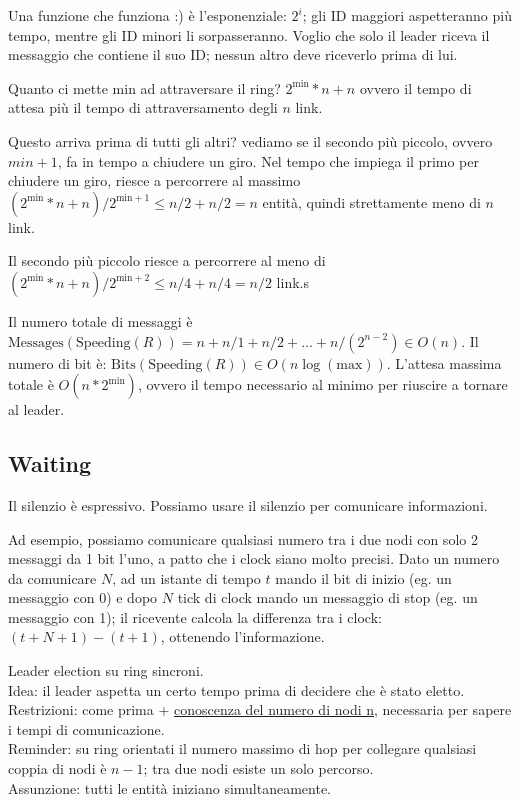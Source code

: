 Una funzione che funziona :) è l'esponenziale: $2^i$; gli ID maggiori aspetteranno più tempo, mentre gli ID minori li sorpasseranno.
Voglio che solo il leader riceva il messaggio che contiene il suo ID; nessun altro deve riceverlo prima di lui.

Quanto ci mette min ad attraversare il ring? $2^\text{min} * n + n$ ovvero il tempo di attesa più il tempo di attraversamento degli $n$ link.

Questo arriva prima di tutti gli altri? vediamo se il secondo più piccolo, ovvero $min+1$, fa in tempo a chiudere un giro.
Nel tempo che impiega il primo per chiudere un giro, riesce a percorrere al massimo $(2^\text{min} * n + n) / 2^{\text{min}+1} \leq n/2 + n/2 = n$ entità,
quindi strettamente meno di $n$ link.

Il secondo più piccolo riesce a percorrere al meno di $(2^\text{min} * n + n) / 2^{\text{min}+2} \leq n/4 + n/4 = n/2$ link.s

Il numero totale di messaggi è $\text{Messages}(\text{Speeding}(R)) = n + n/1 + n/2 + \dots + n/(2^{n-2}) \in O(n)$.
Il numero di bit è: $\text{Bits}(\text{Speeding}(R)) \in O(n \log(\text{max}))$.
L'attesa massima totale è $O(n * 2^\text{min})$, ovvero il tempo necessario al minimo per riuscire a tornare al leader.

\subsection{Waiting}
Il silenzio è espressivo. Possiamo usare il silenzio per comunicare informazioni.

Ad esempio, possiamo comunicare qualsiasi numero tra i due nodi con solo 2 messaggi da 1 bit l'uno, a patto che i clock siano molto
precisi. Dato un numero da comunicare $N$, ad un istante di tempo $t$ mando il bit di inizio (eg. un messaggio con 0) e dopo $N$ tick di clock
mando un messaggio di stop (eg. un messaggio con 1); il ricevente calcola la differenza tra i clock: $(t+N+1) - (t+1)$, ottenendo l'informazione.

Leader election su ring sincroni. \\
Idea: il leader aspetta un certo tempo prima di decidere che è stato eletto. \\
Restrizioni: come prima + \underline{conoscenza del numero di nodi n}, necessaria per sapere i tempi di comunicazione. \\

Reminder: su ring orientati il numero massimo di hop per collegare qualsiasi coppia di nodi è $n-1$; tra due nodi esiste un solo percorso. \\
Assunzione: tutti le entità iniziano simultaneamente. \\

